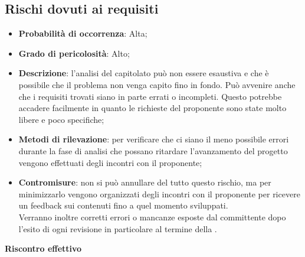 

	\subsection{Rischi dovuti ai requisiti} %
	\label{sub:rischi_dovuti_ai_requisiti}
		\begin{itemize}
			\item \textbf{Probabilità di occorrenza}: Alta;
			\item \textbf{Grado di pericolosità}: Alto;
			\item \textbf{Descrizione}: l'analisi del capitolato può non essere esaustiva e che è possibile che il problema non venga capito fino in fondo. Può avvenire anche che i requisiti trovati siano in parte errati o incompleti. Questo potrebbe accadere facilmente in quanto le richieste del proponente sono state molto libere e poco specifiche;
			\item \textbf{Metodi di rilevazione}: per verificare che ci siano il meno possibile errori durante la fase di analisi che possano ritardare l'avanzamento del progetto vengono effettuati degli incontri con il proponente;
			\item \textbf{Contromisure}: non si può annullare del tutto questo rischio, ma per minimizzarlo vengono organizzati degli incontri con il proponente per ricevere un feedback sui contenuti fino a quel momento sviluppati. \\
			Verranno inoltre corretti errori o mancanze esposte dal committente dopo l'esito di ogni revisione in particolare al termine della \RR.			
		\end{itemize}
	\noindent
	\textbf{Riscontro effettivo}

